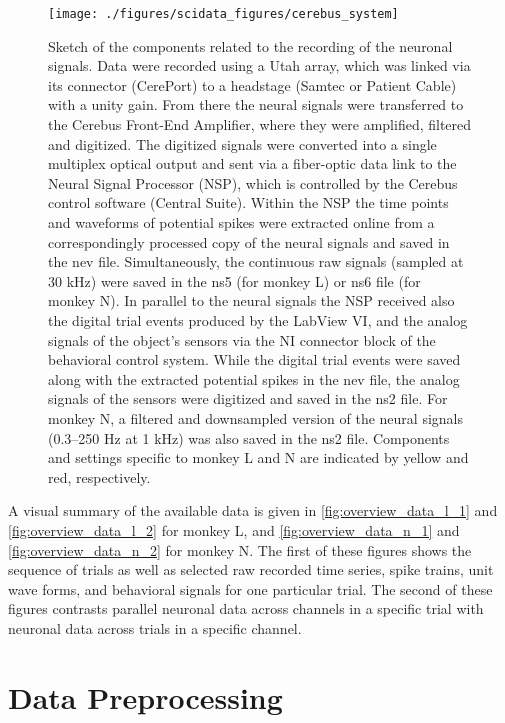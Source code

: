 \begin{figure}
 \centering
 \texttt{[image: ./figures/scidata\_figures/cerebus\_system]}
 \caption[Sketch of the components related to the recording of the neuronal signals]{Sketch of the components related to the recording of the neuronal signals. Data were recorded
using a Utah array, which was linked via its connector (CerePort) to a headstage (Samtec or Patient Cable) with a unity gain. From there the neural signals were transferred to the Cerebus Front-End Amplifier, where they were amplified, filtered and digitized. The digitized signals were converted into a single multiplex optical output and sent via a fiber-optic data link to the Neural Signal Processor (NSP), which is controlled by the Cerebus control software (Central Suite). Within the NSP the time points and waveforms of potential spikes were extracted online from a correspondingly processed copy of the neural signals and saved in the nev file. Simultaneously, the continuous raw signals (sampled at 30 kHz) were saved in the ns5 (for monkey L) or ns6 file (for monkey N). In parallel to the neural signals the NSP received also the digital trial events produced by the LabView VI, and the analog signals of the object’s sensors via the NI connector block of the behavioral control system. While the digital trial events were saved along with the extracted potential spikes in the nev file,
the analog signals of the sensors were digitized and saved in the ns2 file. For monkey N, a filtered and downsampled version of the neural signals (0.3–250 Hz at 1 kHz) was also saved in the ns2 file. Components and settings specific to monkey L and N are indicated by yellow and red, respectively.}
\label{fig:cerebus_system}
\end{figure}

A visual summary of the available data is given in \cref{fig:overview_data_l_1} and \cref{fig:overview_data_l_2}  for monkey L, and \cref{fig:overview_data_n_1} and \cref{fig:overview_data_n_2} for monkey N. The first of these figures shows the sequence of trials as well as selected raw recorded time series, spike trains, unit wave forms, and behavioral signals for one particular trial. The second of these figures contrasts parallel neuronal data across channels in a specific trial with neuronal data across trials in a specific channel.


\section{Data Preprocessing}
\label{sec:data_preprocessing}

